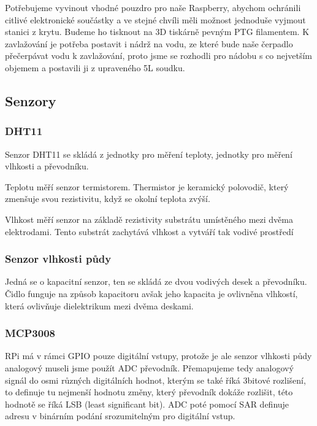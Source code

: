 \documentclass[12pt,a4paper]{article}
\begin{document}
Potřebujeme vyvinout vhodné pouzdro pro naše Raspberry, abychom ochránili
citlivé elektronické součástky a ve stejné chvíli měli možnost jednoduše
vyjmout stanici z krytu. Budeme ho tisknout na 3D tiskárně pevným PTG
filamentem. K
zavlažování je potřeba postavit i nádrž na vodu, ze které bude naše čerpadlo
přečerpávat vodu k zavlažování, proto jsme se rozhodli pro nádobu s co
nejvetším objemem a postavili ji z upraveného 5L soudku.

\subsection{Senzory}

\subsubsection{DHT11}

Senzor DHT11 se skládá z jednotky pro měření teploty, jednotky pro měření
vlhkosti a převodníku.

Teplotu měří senzor termistorem. Thermistor je keramický polovodič, který
zmenšuje svou rezistivitu, když se okolní teplota zvýší.

Vlhkost měří senzor na základě rezistivity substrátu umístěného mezi dvěma
elektrodami. Tento substrát zachytává vlhkost a vytváří tak vodivé prostředí

\subsubsection{Senzor vlhkosti půdy}

Jedná se o kapacitní senzor, ten se skládá ze dvou vodivých desek a převodníku.
Čidlo funguje na způsob kapacitoru avšak jeho kapacita je ovlivněna vlhkostí,
která ovlivňuje dielektrikum mezi dvěma deskami.

\subsubsection{MCP3008}

RPi má v rámci GPIO pouze digitální vstupy, protože je ale senzor vlhkosti půdy
analogový museli jsme použít ADC převodník. Přemapujeme tedy analogový signál
do
osmi různých digitálních hodnot, kterým se také říká 3bitové rozlišení, to
definuje tu nejmenší hodnotu změny, který převodník dokáže rozlišit, této
hodnotě se říká LSB (least significant bit). ADC poté pomocí SAR
definuje adresu v binárním podání srozumitelným pro digitální vstup.
\end{document}
